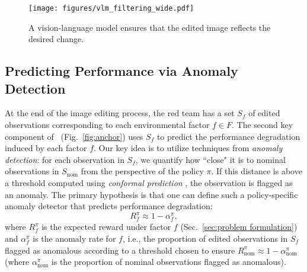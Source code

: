 \begin{figure}[h]
    \centering
    \texttt{[image: figures/vlm\_filtering\_wide.pdf]}
    \caption{A vision-language model ensures that the edited image reflects the desired change.}
    \label{fig:vlm filter}
\vspace{-5pt}
\end{figure}

\subsection{Predicting Performance via Anomaly Detection}
\label{sec:anomaly detection}

At the end of the image editing process, the red team has a set $S_f$ of edited observations corresponding to each environmental factor $f \in F$. The second key component of \redit~(Fig.~\ref{fig:anchor}) uses $S_f$ to predict the performance degradation induced by each factor $f$. Our key idea is to utilize techniques from \emph{anomaly detection}: for each observation in $S_f$, we quantify how ``close" it is to nominal observations in $S_\text{nom}$ from the perspective of the policy $\pi$. If this distance is above a threshold computed using \emph{conformal prediction} \cite{vovk2005algorithmic}, the observation is flagged as an anomaly. The primary hypothesis is that one can define such a policy-specific anomaly detector that predicts performance degradation:
\begin{equation}
\label{eq:linear prediction}
R_f^\pi \approx 1 - \alpha_f^\pi,
\end{equation}
where $R_f^\pi$ is the expected reward under factor $f$ (Sec.~\ref{sec:problem formulation}) and $\alpha_f^\pi$ is the anomaly rate for $f$, i.e., the proportion of edited observations in $S_f$ flagged as anomalous according to a threshold chosen to ensure $R_\text{nom}^\pi \approx 1 - \alpha_\text{nom}^\pi$ (where $\alpha_\text{nom}^\pi$ is the proportion of nominal observations flagged as anomalous). 


